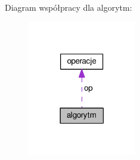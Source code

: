Diagram współpracy dla algorytm\-:\nopagebreak
\begin{figure}[H]
\begin{center}
\leavevmode
\includegraphics[width=134pt]{classalgorytm__coll__graph}
\end{center}
\end{figure}
